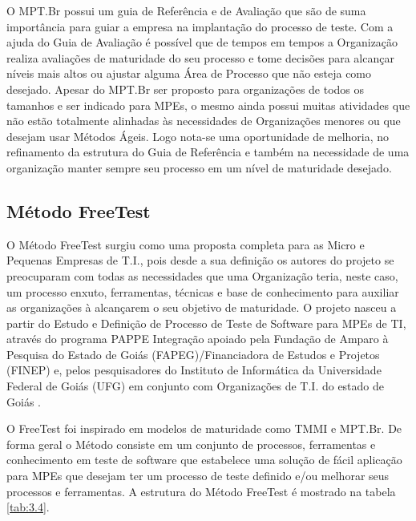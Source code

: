 O MPT.Br possui um guia de Referência e de Avaliação que são de suma importância para guiar a empresa na implantação do processo de teste. Com a ajuda do Guia de Avaliação é possível que de tempos em tempos a Organização realiza avaliações de maturidade do seu processo e tome decisões para alcançar níveis mais altos ou ajustar alguma Área de Processo que não esteja como desejado. Apesar do MPT.Br ser proposto para organizações de todos os tamanhos e ser indicado para MPEs, o mesmo ainda possui muitas atividades que não estão totalmente alinhadas às necessidades de Organizações menores ou que desejam usar Métodos Ágeis. Logo nota-se uma oportunidade de melhoria, no refinamento da estrutura do Guia de Referência e também na necessidade de uma organização manter sempre seu processo em um nível de maturidade desejado.

\subsection{Método FreeTest}
\label{freetest}

O Método FreeTest \cite{Camilo-junior2012} surgiu como uma proposta completa para as Micro e Pequenas Empresas de T.I., pois desde a sua definição os autores do projeto se preocuparam com todas as necessidades que uma Organização teria, neste caso, um processo enxuto, ferramentas, técnicas e base de conhecimento para auxiliar as organizações à alcançarem o seu objetivo de maturidade. O projeto nasceu a partir do Estudo e Definição de Processo de Teste de Software para MPEs de TI, através do programa PAPPE Integração apoiado pela Fundação de Amparo à Pesquisa do Estado de Goiás (FAPEG)/Financiadora de Estudos e Projetos (FINEP) e, pelos pesquisadores do Instituto de Informática da Universidade Federal de Goiás (UFG) em conjunto com Organizações de T.I. do estado de Goiás \cite{Camilo-junior2012a}.

O FreeTest foi inspirado em modelos de maturidade como TMMI e MPT.Br. De forma geral o Método consiste em um conjunto de processos, ferramentas e conhecimento em teste de software que estabelece uma solução de fácil aplicação para MPEs que desejam ter um processo de teste definido e/ou melhorar seus processos e ferramentas. A estrutura do Método FreeTest é mostrado na tabela \ref{tab:3.4}.


